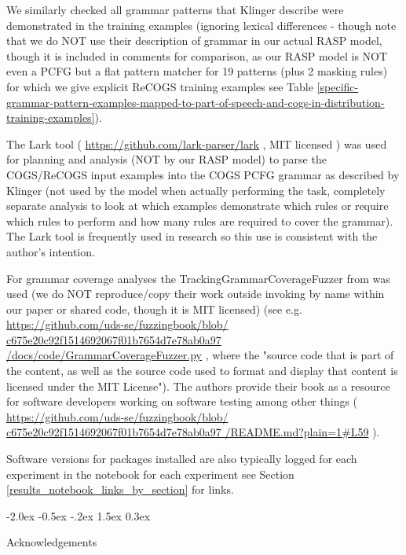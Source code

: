 \documentclass[11pt]{article}
\makeatletter
\renewcommand\section{\@startsection{section}{1}{\z@}%
                                  {-2.0ex \@plus -0.5ex \@minus -.2ex}%
                                  {1.5ex \@plus 0.3ex}%
                                  {\large\bfseries\raggedright}}
\makeatother
\begin{document}
We similarly checked all grammar patterns that Klinger describe were demonstrated in the training examples  (ignoring lexical differences - though note that we do NOT use their description of grammar in our actual RASP model, though it is included in comments for comparison, as our RASP model is NOT even a PCFG but a flat pattern matcher for 19 patterns (plus 2 masking rules) for which we give explicit ReCOGS training examples see Table \ref{specific-grammar-pattern-examples-mapped-to-part-of-speech-and-cogs-in-distribution-training-examples}). 

The Lark tool ( \href{https://github.com/lark-parser/lark}{https://github.com/lark-parser/lark} , MIT licensed ) was used for planning and analysis (NOT by our RASP model) to parse the COGS/ReCOGS input examples into the COGS PCFG grammar as described by Klinger (not used by the model when actually performing the task, completely separate analysis to look at which examples demonstrate which rules or require which rules to perform and how many rules are required to cover the grammar). The Lark tool is frequently used in research so this use is consistent with the author's intention.

For grammar coverage analyses the TrackingGrammarCoverageFuzzer from \citep{fuzzingbook2023:GrammarCoverageFuzzer} was used (we do NOT reproduce/copy their work outside invoking by name within our paper or shared code, though it is MIT licensed) (see e.g. \href{https://github.com/uds-se/fuzzingbook/blob/c675e20c92f1514692067f01b7654d7e78ab0a97/docs/code/GrammarCoverageFuzzer.py}{https://github.com/uds-se/fuzzingbook/blob/
c675e20c92f1514692067f01b7654d7e78ab0a97
/docs/code/GrammarCoverageFuzzer.py} , where the "source code that is part of the content, as well as the source code used to format and display that content is licensed under the MIT License"). The authors \citep{fuzzingbook2023:GrammarCoverageFuzzer} provide their book as a resource for software developers working on software testing among other things ( \href{https://github.com/uds-se/fuzzingbook/blob/c675e20c92f1514692067f01b7654d7e78ab0a97/README.md?plain=1\#L59}{https://github.com/uds-se/fuzzingbook/blob/
c675e20c92f1514692067f01b7654d7e78ab0a97
/README.md?plain=1\#L59} ).

Software versions for packages installed are also typically logged for each experiment in the notebook for each experiment see Section \ref{results_notebook_links_by_section} for links.

\section{Acknowledgements}
\end{document}
